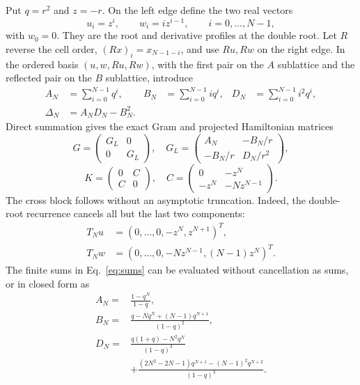 \documentclass[aps,prb,reprint,superscriptaddress,longbibliography]{revtex4-2}
\begin{document}
Put $q=r^2$ and $z=-r$.  On the left edge define the two real vectors
\begin{equation}
 u_i=z^i,\qquad w_i=i z^{i-1},\qquad i=0,\ldots,N-1,
 \label{eq:uw}
\end{equation}
with $w_0=0$.  They are the root and derivative profiles at the double root.
Let $R$ reverse the cell order, $(Rx)_i=x_{N-1-i}$, and use $Ru,Rw$ on the
right edge.  In the ordered basis $(u,w,Ru,Rw)$, with the first pair on the
$A$ sublattice and the reflected pair on the $B$ sublattice, introduce
\begin{align}
 A_N&=\sum_{i=0}^{N-1}q^i,&
 B_N&=\sum_{i=0}^{N-1}i q^i,&
 D_N&=\sum_{i=0}^{N-1}i^2q^i,\nonumber\\
 \Delta_N&=A_ND_N-B_N^2.&&&
 \label{eq:sums}
\end{align}
Direct summation gives the exact Gram and projected Hamiltonian matrices
\begin{equation}
 G=\begin{pmatrix}G_L&0\\0&G_L\end{pmatrix},\quad
 G_L=\begin{pmatrix}A_N&-B_N/r\\-B_N/r&D_N/r^2\end{pmatrix},
 \label{eq:gram}
\end{equation}
\begin{equation}
 K=\begin{pmatrix}0&C\\C&0\end{pmatrix},\quad
 C=\begin{pmatrix}0&-z^N\\-z^N&-Nz^{N-1}\end{pmatrix}.
 \label{eq:cross}
\end{equation}
The cross block follows without an asymptotic truncation.  Indeed, the
double-root recurrence cancels all but the last two components:
\begin{align}
 T_Nu&=(0,\ldots,0,-z^N,z^{N+1})^T,\nonumber\\
 T_Nw&=(0,\ldots,0,-Nz^{N-1},(N-1)z^N)^T.
 \label{eq:boundaryres}
\end{align}
The finite sums in Eq.~\eqref{eq:sums} can be evaluated without cancellation
as sums, or in closed form as
\begin{align}
 A_N={}&\frac{1-q^N}{1-q},\nonumber\\
 B_N={}&\frac{q-Nq^N+(N-1)q^{N+1}}{(1-q)^2},\nonumber\\
 D_N={}&\frac{q(1+q)-N^2q^N}{(1-q)^3}\nonumber\\
 &+\frac{(2N^2-2N-1)q^{N+1}-(N-1)^2q^{N+2}}
 {(1-q)^3}.
 \label{eq:closedsums}
\end{align}
\end{document}
